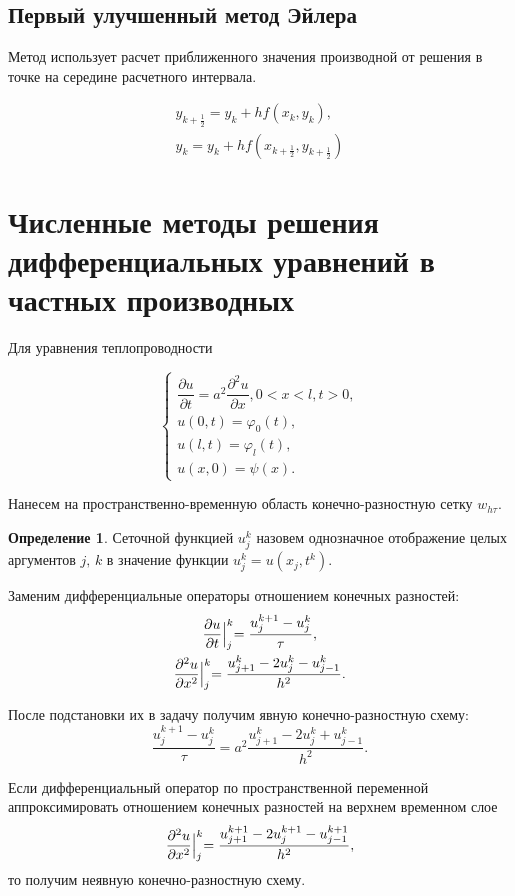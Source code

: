 \documentclass[12pt]{report}
\theoremstyle{definition}
\newtheorem{definition}[theorem]{Определение}
\begin{document}
\subsection{Первый улучшенный метод Эйлера}
Метод использует расчет приближенного значения производной
от решения в точке на середине расчетного интервала.

\begin{gather*}
y_{k+\frac{1}{2}} = y_k + h f(x_k, y_k), \\
y_k = y_k + h f(x_{k+\frac{1}{2}}, y_{k+\frac{1}{2}})
\end{gather*}


\section{Численные методы решения дифференциальных уравнений в частных производных}

Для уравнения теплопроводности

$$
\begin{cases}
\dfrac{\partial u}{\partial t} = a^2 \dfrac{\partial^2 u}{\partial x},
0 < x < l, t > 0, \\
u(0, t) = \varphi_0(t), \\
u(l, t) = \varphi_l(t), \\
u(x, 0) = \psi(x).
\end{cases}
$$

Нанесем на пространственно-временную область конечно-разностную сетку $w_{h\tau}$.

\begin{definition}
Сеточной функцией $u^k_j$ назовем однозначное отображение целых
аргументов $j, \, k$ в значение функции $u^k_j = u(x_j, t^k)$.
\end{definition}

Заменим дифференциальные операторы отношением конечных разностей:
\begin{gather*}
\dfrac{\partial u}{\partial t} \Bigl|^k_j = \dfrac{u^{k+1}_j - u^{k}_j}{\tau}, \\
\dfrac{\partial^2 u}{\partial x^2} \Bigl|^k_j = \dfrac{u^k_{j+1} - 2u^k_j - u^k_{j-1}}{h^2}.
\end{gather*}

После подстановки их в задачу получим явную конечно-разностную схему:
$$
\dfrac{u^{k+1}_j - u^k_j}{\tau} = a^2 \dfrac{u^k_{j+1} - 2u^k_j + u^k_{j-1}}{h^2}.
$$

Если дифференциальный оператор по пространственной переменной аппроксимировать
отношением конечных разностей на верхнем временном слое
$$
\dfrac{\partial^2 u}{\partial x^2} \Bigl|^k_j = \dfrac{u^{k+1}_{j+1} - 2u^{k+1}_j - u^{k+1}_{j-1}}{h^2},
$$
то получим неявную конечно-разностную схему.
\end{document}
